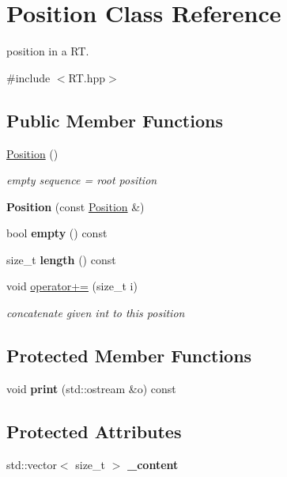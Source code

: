 \hypertarget{classPosition}{}\section{Position Class Reference}
\label{classPosition}


position in a RT.  




{\ttfamily \#include $<$R\+T.\+hpp$>$}

\subsection*{Public Member Functions}
\begin{DoxyCompactItemize}
\item 
\mbox{\hyperlink{group__output_ga369a577425f8ba02e8750d04b6a088db}{Position}} ()
\begin{DoxyCompactList}\small\item\em empty sequence = root position \end{DoxyCompactList}\item 
{\bfseries Position} (const \mbox{\hyperlink{classPosition}{Position}} \&)
\item 
bool {\bfseries empty} () const
\item 
size\+\_\+t {\bfseries length} () const
\item 
void \mbox{\hyperlink{group__output_gab6b7dd5c2869fb23755faee32f1e6731}{operator+=}} (size\+\_\+t i)
\begin{DoxyCompactList}\small\item\em concatenate given int to this position \end{DoxyCompactList}\end{DoxyCompactItemize}
\subsection*{Protected Member Functions}
\begin{DoxyCompactItemize}
\item 
void {\bfseries print} (std\+::ostream \&o) const
\end{DoxyCompactItemize}
\subsection*{Protected Attributes}
\begin{DoxyCompactItemize}
\item 
\mbox{\label{classPosition_afccdc3a3b6183af2b150c4672ccf4b2f}} 
std\+::vector$<$ size\+\_\+t $>$ {\bfseries \+\_\+content}
\end{DoxyCompactItemize}
